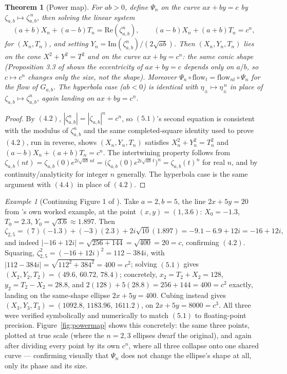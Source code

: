 \documentclass[11pt]{amsart}
\newtheorem{theorem}{Theorem}[section]
\theoremstyle{remark}
\newtheorem*{example}{Example}
\begin{document}
\begin{theorem}[Power map]\label{thm:powermap}
For $ab>0$, define $\Psi_n$ on the curve $ax+by=c$ by $\zeta_{a,b}\mapsto\zeta_{a,b}^{\,n}$, then solving the linear system
\begin{equation}
(a+b)X_n+(a-b)T_n=\mathrm{Re}(\zeta_{a,b}^n),\qquad(a-b)X_n+(a+b)T_n=c^n, \tag{5.1}
\end{equation}
for $(X_n,T_n)$, and setting $Y_n=\mathrm{Im}(\zeta_{a,b}^n)/(2\sqrt{ab})$. Then $(X_n,Y_n,T_n)$ lies on the cone $X^2+Y^2=T^2$ and on the curve $ax+by=c^n$: the same conic shape (Proposition 3.3 of \cite{Ebert2026Table} shows the eccentricity of $ax+by=c$ depends only on $a/b$, so $c\mapsto c^n$ changes only the size, not the shape). Moreover $\Psi_n\circ\mathrm{flow}_t=\mathrm{flow}_{nt}\circ\Psi_n$ for the flow of $G_{a,b}$. The hyperbola case ($ab<0$) is identical with $\eta_\pm\mapsto\eta_\pm^{\,n}$ in place of $\zeta_{a,b}\mapsto\zeta_{a,b}^n$, again landing on $ax+by=c^n$.
\end{theorem}

\begin{proof}
By $(4.2)$, $|\zeta_{a,b}^n|=|\zeta_{a,b}|^n=c^n$, so $(5.1)$'s second equation is consistent with the modulus of $\zeta_{a,b}^n$ and the same completed-square identity used to prove $(4.2)$, run in reverse, shows $(X_n,Y_n,T_n)$ satisfies $X_n^2+Y_n^2=T_n^2$ and $(a-b)X_n+(a+b)T_n=c^n$. The intertwining property follows from $\zeta_{a,b}(nt)=\zeta_{a,b}(0)e^{2i\sqrt{ab}\,nt}=\bigl(\zeta_{a,b}(0)e^{2i\sqrt{ab}\,t}\bigr)^n=\zeta_{a,b}(t)^n$ for real $n$, and by continuity/analyticity for integer $n$ generally. The hyperbola case is the same argument with $(4.4)$ in place of $(4.2)$.
\end{proof}

\begin{example}[Continuing Figure 1 of \cite{Ebert2026Table}]
Take $a=2,b=5$, the line $2x+5y=20$ from \cite{Ebert2026Table}'s own worked example, at the point $(x,y)=(1,3.6)$: $X_0=-1.3$, $T_0=2.3$, $Y_0=\sqrt{3.6}\approx1.897$. Then
\[
\zeta_{2,5}=(7)(-1.3)+(-3)(2.3)+2i\sqrt{10}(1.897)=-9.1-6.9+12i=-16+12i,
\]
and indeed $|-16+12i|=\sqrt{256+144}=\sqrt{400}=20=c$, confirming $(4.2)$. Squaring, $\zeta_{2,5}^2=(-16+12i)^2=112-384i$, with $|112-384i|=\sqrt{112^2+384^2}=400=c^2$; solving $(5.1)$ gives $(X_2,Y_2,T_2)=(49.6,\,60.72,\,78.4)$; concretely, $x_2=T_2+X_2=128$, $y_2=T_2-X_2=28.8$, and $2(128)+5(28.8)=256+144=400=c^2$ exactly, landing on the same-shape ellipse $2x+5y=400$. Cubing instead gives $(X_3,Y_3,T_3)=(1092.8,\,1183.96,\,1611.2)$, on $2x+5y=8000=c^3$. All three were verified symbolically and numerically to match $(5.1)$ to floating-point precision. Figure~\ref{fig:powermap} shows this concretely: the same three points, plotted at true scale (where the $n=2,3$ ellipses dwarf the original), and again after dividing every point by its own $c^n$, where all three collapse onto one shared curve --- confirming visually that $\Psi_n$ does not change the ellipse's shape at all, only its phase and its size.
\end{example}
\end{document}
